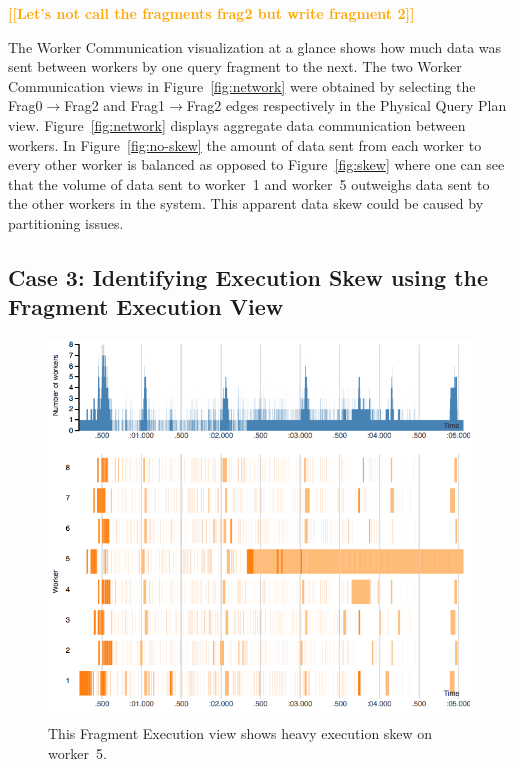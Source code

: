 \documentclass{chi2009}
\newcommand*{\graph}{Physical Query Plan\xspace}
\newcommand*{\fragment}{Fragment Execution\xspace}
\newcommand*{\network}{Worker Communication\xspace}
\newcommand{\todo}[1]{\textsf{\textbf{\textcolor{Orange}{[[#1]]}}}}
\begin{document}
\todo{Let's not call the fragments frag2 but write fragment 2}

The \network visualization at a glance shows how much data was sent between workers by one query fragment to the next. The two \network views in Figure~\ref{fig:network} were obtained by selecting the Frag0$\rightarrow$Frag2 and Frag1$\rightarrow$Frag2 edges respectively in the \graph view. Figure~\ref{fig:network} displays aggregate data communication between workers. In Figure~\ref{fig:no-skew} the amount of data sent from each worker to every other worker is balanced as opposed to Figure~\ref{fig:skew} where one can see that the volume of data sent to worker~1 and worker~5 outweighs data sent to the other workers in the system. This apparent data skew could be caused by partitioning issues.

\subsection{Case 3: Identifying Execution Skew using the \fragment View}

\begin{figure}[ht]
  \includegraphics[width=\columnwidth]{images/execution_skew}
  \caption{This \fragment view shows heavy execution skew on worker~5.}
  \label{fig:exec_skew}
\end{figure}
\end{document}

